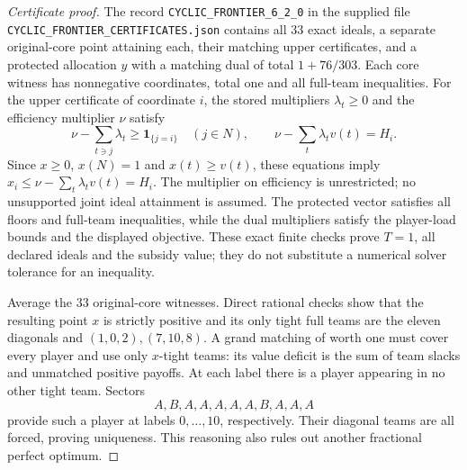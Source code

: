 \documentclass[11pt]{article}
\theoremstyle{remark}
\newcommand{\one}{\mathbf 1}
\begin{document}
\begin{proof}[Certificate proof]
The record \texttt{CYCLIC\_FRONTIER\_6\_2\_0} in the supplied file
\texttt{CYCLIC\_FRONTIER\_CERTIFICATES.json} contains all $33$ exact
ideals, a separate original-core point attaining each, their matching
upper certificates, and a protected allocation $y$ with a matching dual
of total $1+76/303$. Each core witness has nonnegative coordinates,
total one and all full-team inequalities. For the upper certificate of coordinate $i$, the stored multipliers
$\lambda_t\ge0$ and the efficiency multiplier $\nu$ satisfy
\[
 \nu-\sum_{t\ni j}\lambda_t\ge\one_{\{j=i\}}
 \quad(j\in N),\qquad
 \nu-\sum_t\lambda_tv(t)=H_i.
\]
Since $x\ge0$, $x(N)=1$ and $x(t)\ge v(t)$, these equations imply
$x_i\le\nu-\sum_t\lambda_tv(t)=H_i$. The multiplier on efficiency
is unrestricted; no unsupported joint ideal attainment is assumed. The protected vector satisfies all
floors and full-team inequalities, while the dual multipliers satisfy
the player-load bounds and the displayed objective. These exact finite
checks prove $T=1$, all declared ideals and the subsidy value; they do
not substitute a numerical solver tolerance for an inequality.

Average the $33$ original-core witnesses. Direct rational checks show
that the resulting point $x$ is strictly positive and its only tight
full teams are the eleven diagonals and $(1,0,2),(7,10,8)$.
A grand matching of worth one must cover every player and use only
$x$-tight teams: its value deficit is the sum of team slacks and
unmatched positive payoffs. At each label there is a player appearing
in no other tight team. Sectors
\[
                       A,B,A,A,A,A,A,B,A,A,A
\]
provide such a player at labels $0,\ldots,10$, respectively.
Their diagonal teams are all forced, proving uniqueness. This reasoning
also rules out another fractional perfect optimum.


\end{proof}
\end{document}
